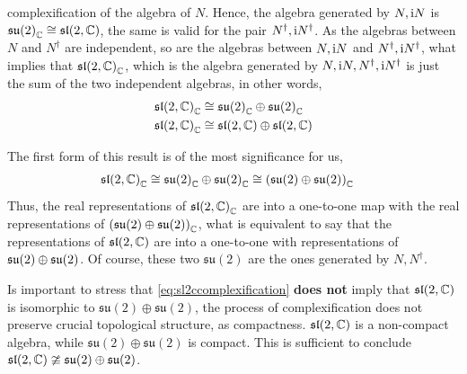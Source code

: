 complexification of the algebra of $N$. Hence, the algebra generated by $N,\textnormal{i} N$ is $\mathfrak {su}\qty(2)_{\mathbb C}\cong \mathfrak {sl}\qty(2,\mathbb C)$, the same is valid for 
the pair $N^\dagger, \textnormal{i} N^\dagger$. As the algebras between $N$ and $N^\dagger$ are independent, so are the algebras between $N,\textnormal{i} N$ and $N^\dagger, \textnormal{i} N^\dagger$, what implies that 
$\mathfrak{sl}\qty(2,\mathbb C)_{\mathbb C}$, which is the algebra generated by $N,\textnormal{i} N,N^\dagger, \textnormal{i} N^\dagger$ is just the sum of the two independent algebras, in other words, 
\begin{align}
    \mathfrak{sl}\qty(2,\mathbb C)_{\mathbb C}&\cong \mathfrak {su}\qty(2)_{\mathbb C}\oplus \mathfrak {su}\qty(2)_{\mathbb C}\\
    \mathfrak{sl}\qty(2,\mathbb C)_{\mathbb C}&\cong \mathfrak{sl}\qty(2,\mathbb C)\oplus\mathfrak{sl}\qty(2,\mathbb C)
\end{align}

The first form of this result is of the most significance for us,
\begin{align}
    \mathfrak{sl}\qty(2,\mathbb C)_{\mathbb C}&\cong \mathfrak {su}\qty(2)_{\mathbb C}\oplus \mathfrak {su}\qty(2)_{\mathbb C}\cong \qty(\mathfrak {su}\qty(2)\oplus \mathfrak {su}\qty(2))_{\mathbb C}\label{eq:sl2ccomplexification}
\end{align}
Thus, the real representations of $\mathfrak{sl}\qty(2,\mathbb C)_{\mathbb C}$ are into a one-to-one map with the real representations of $\qty(\mathfrak {su}\qty(2)\oplus \mathfrak {su}\qty(2))_{\mathbb C}$, 
what is equivalent to say that the representations of $\mathfrak{sl}\qty(2,\mathbb C)$ are into a one-to-one with representations of $\mathfrak {su}\qty(2)\oplus \mathfrak {su}\qty(2)$. 
Of course, these two $\mathfrak {su}(2)$ are the ones generated by $N, N^\dagger$. 

Is important to stress that \cref{eq:sl2ccomplexification} \textbf{does not} imply that $\mathfrak {sl}\qty(2,\mathbb C)$ is isomorphic to $\mathfrak {su}(2)\oplus\mathfrak {su}(2)$, the process 
of complexification does not preserve crucial topological structure, as compactness. $\mathfrak {sl}\qty(2,\mathbb C)$ is a non-compact algebra, while $\mathfrak {su}(2)\oplus\mathfrak {su}(2)$ 
is compact. This is sufficient to conclude $\mathfrak {sl}\qty(2,\mathbb C)\ncong\mathfrak {su}(2)\oplus\mathfrak {su}(2)$.

